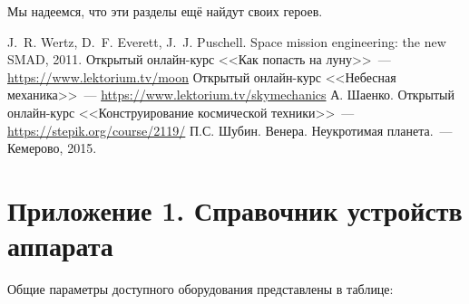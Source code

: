 \documentclass[12pt,a4paper]{article}
\begin{document}
Мы надеемся, что эти разделы ещё найдут своих героев.

\begin{thebibliography}{3}
 J.~R. Wertz, D.~F. Everett, J.~J. Puschell. Space mission
  engineering: the new SMAD, 2011.
 Открытый онлайн-курс <<Как попасть на луну>>~---
  \url{https://www.lektorium.tv/moon}
 Открытый онлайн-курс <<Небесная механика>>~---
  \url{https://www.lektorium.tv/skymechanics}
 А. Шаенко. Открытый онлайн-курс <<Конструирование космической техники>>~---
  \url{https://stepik.org/course/2119/}
 П.С. Шубин. Венера. Неукротимая планета.~--- Кемерово, 2015. 
\end{thebibliography}

\section*{Приложение 1. Справочник устройств аппарата}
\label{Sec:Devices}

Общие параметры доступного оборудования представлены в таблице:
\end{document}
